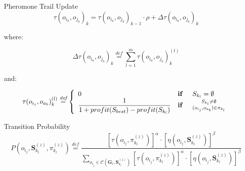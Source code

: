 \documentclass[13.5pt]{beamer}
\newcommand{\mathDef}{\overset{\textit{def}}{=}}
\begin{document}

\begin{frame}[noframenumbering]
	
	\begin{block}{Pheromone Trail Update}
		\begin{equation}
			\tau(o_{i_a}, o_{j_b})_k = \tau(o_{i_a}, o_{j_b})_{k-1} \cdot \rho + \Delta \tau(o_{i_a}, o_{j_b})_{k} \nonumber
		\end{equation}
	\end{block}

	where:
	
	\begin{equation}
		\Delta \tau(o_{i_a}, o_{j_b})_{k} \mathDef \sum_{l=1}^{m} \tau(o_{i_a}, o_{j_b})_k^{(l)}
	\end{equation}

	and:

	\begin{equation}
		\tau(o_{i_j}, o_{a_b})_{k}^{(l)} \mathDef \left\{ 
		\begin{array}{lll}
			0 & \text{\textbf{if }} & S_{k_l} = \emptyset \\ 
			\displaystyle \frac{1}{1 + profit(S_{best}) - profit(S_{k_l})} & \text{\textbf{if }} & \substack{S_{k_l} \neq \emptyset \\ (o_{i_j}, o_{a_b}) \in \pi_{k_l}} \\ 
		\end{array} \right.
	\end{equation}
	
\end{frame} 


\begin{frame}[noframenumbering]
	\begin{block}{Transition Probability}
\begin{equation}
	P(o_{i_j}, \textbf{S}_{k_l}^{(z)}, \pi_{k_l}^{(z)}) \mathDef \frac{\left[ \tau( o_{i_j}, \pi_{k_l}^{(z)}) \right]^{\alpha} \cdot \left[ \eta( o_{i_j}, \textbf{S}_{k_l}^{(z)}) \right]^{\beta}}{\displaystyle \sum_{o_{i_j} \in \mathcal{C}(\textbf{G}_i, \textbf{S}_{k_l}^{(z)})} \left[ \tau( o_{i_j}, \pi_{k_l}^{(z)}) \right]^{\alpha} \cdot \left[ \eta( o_{i_j}, \textbf{S}_{k_l}^{(z)}) \right]^{\beta}}
\end{equation}
\end{block}
\end{frame} 
\end{document}
